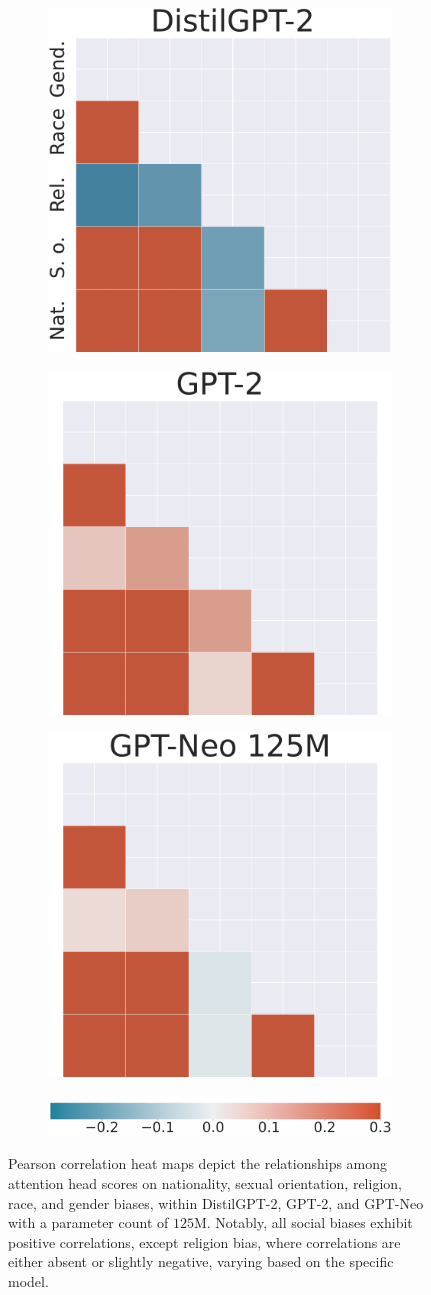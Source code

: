 \documentclass[letterpaper]{article} %
\begin{document}
\begin{figure}[]
     \centering
    \begin{subfigure}
    \centering    \includegraphics[width=0.31\linewidth]{figures/corr_head_effects_different_biases_DistilGPT-2_3.pdf}
     \end{subfigure}
   \begin{subfigure}
    \centering    \includegraphics[width=0.31\linewidth]{figures/corr_head_effects_different_biases_GPT-2_2.pdf}
     \end{subfigure}
     \begin{subfigure}
    \centering    \includegraphics[width=0.31\linewidth]{figures/corr_head_effects_different_biases_GPT-Neo_125M_3.pdf}
     \end{subfigure}

     \begin{subfigure}
    \centering    \includegraphics[width=0.45\linewidth]{figures/corr_heatmap_legend.png}
     \end{subfigure}

        \caption{Pearson correlation heat maps depict the relationships among attention head scores on nationality, sexual orientation, religion, race, and gender biases, within DistilGPT-2, GPT-2, and GPT-Neo with a parameter count of $125$M. Notably, all social biases exhibit positive correlations, except religion bias, where correlations are either absent or slightly negative, varying based on the specific model.}
        \label{fig:correlation_maps}
\end{figure}
\end{document}
